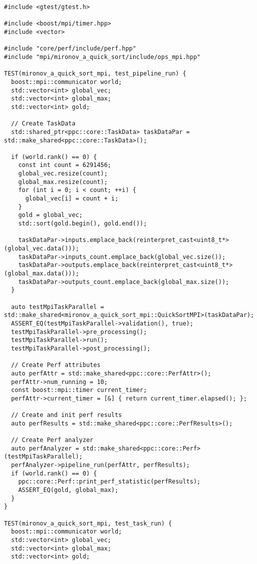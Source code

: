 \documentclass[12pt]{article}
\begin{document}
\begin{lstlisting}
#include <gtest/gtest.h>

#include <boost/mpi/timer.hpp>
#include <vector>

#include "core/perf/include/perf.hpp"
#include "mpi/mironov_a_quick_sort/include/ops_mpi.hpp"

TEST(mironov_a_quick_sort_mpi, test_pipeline_run) {
  boost::mpi::communicator world;
  std::vector<int> global_vec;
  std::vector<int> global_max;
  std::vector<int> gold;

  // Create TaskData
  std::shared_ptr<ppc::core::TaskData> taskDataPar = std::make_shared<ppc::core::TaskData>();

  if (world.rank() == 0) {
    const int count = 6291456;
    global_vec.resize(count);
    global_max.resize(count);
    for (int i = 0; i < count; ++i) {
      global_vec[i] = count + i;
    }
    gold = global_vec;
    std::sort(gold.begin(), gold.end());

    taskDataPar->inputs.emplace_back(reinterpret_cast<uint8_t*>(global_vec.data()));
    taskDataPar->inputs_count.emplace_back(global_vec.size());
    taskDataPar->outputs.emplace_back(reinterpret_cast<uint8_t*>(global_max.data()));
    taskDataPar->outputs_count.emplace_back(global_max.size());
  }

  auto testMpiTaskParallel = std::make_shared<mironov_a_quick_sort_mpi::QuickSortMPI>(taskDataPar);
  ASSERT_EQ(testMpiTaskParallel->validation(), true);
  testMpiTaskParallel->pre_processing();
  testMpiTaskParallel->run();
  testMpiTaskParallel->post_processing();

  // Create Perf attributes
  auto perfAttr = std::make_shared<ppc::core::PerfAttr>();
  perfAttr->num_running = 10;
  const boost::mpi::timer current_timer;
  perfAttr->current_timer = [&] { return current_timer.elapsed(); };

  // Create and init perf results
  auto perfResults = std::make_shared<ppc::core::PerfResults>();

  // Create Perf analyzer
  auto perfAnalyzer = std::make_shared<ppc::core::Perf>(testMpiTaskParallel);
  perfAnalyzer->pipeline_run(perfAttr, perfResults);
  if (world.rank() == 0) {
    ppc::core::Perf::print_perf_statistic(perfResults);
    ASSERT_EQ(gold, global_max);
  }
}

TEST(mironov_a_quick_sort_mpi, test_task_run) {
  boost::mpi::communicator world;
  std::vector<int> global_vec;
  std::vector<int> global_max;
  std::vector<int> gold;


\end{lstlisting}
\end{document}
